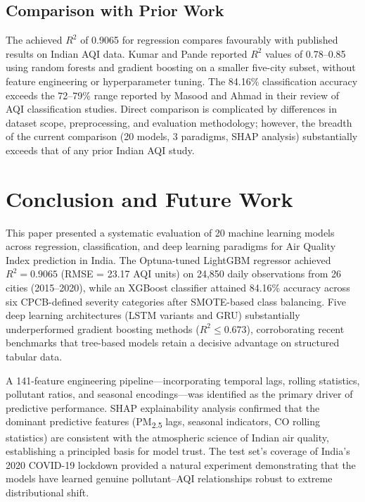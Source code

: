 \documentclass[conference]{IEEEtran}
\begin{document}
\subsection{Comparison with Prior Work}

The achieved $R^2$ of 0.9065 for regression compares favourably with published results on Indian AQI data. Kumar and Pande \cite{kumar2022} reported $R^2$ values of 0.78--0.85 using random forests and gradient boosting on a smaller five-city subset, without feature engineering or hyperparameter tuning. The 84.16\% classification accuracy exceeds the 72--79\% range reported by Masood and Ahmad \cite{masood2023} in their review of AQI classification studies. Direct comparison is complicated by differences in dataset scope, preprocessing, and evaluation methodology; however, the breadth of the current comparison (20 models, 3 paradigms, SHAP analysis) substantially exceeds that of any prior Indian AQI study.

\section{Conclusion and Future Work}

This paper presented a systematic evaluation of 20 machine learning models across regression, classification, and deep learning paradigms for Air Quality Index prediction in India. The Optuna-tuned LightGBM regressor achieved $R^2 = 0.9065$ (RMSE = 23.17 AQI units) on 24{,}850 daily observations from 26 cities (2015--2020), while an XGBoost classifier attained 84.16\% accuracy across six CPCB-defined severity categories after SMOTE-based class balancing. Five deep learning architectures (LSTM variants and GRU) substantially underperformed gradient boosting methods ($R^2 \leq 0.673$), corroborating recent benchmarks that tree-based models retain a decisive advantage on structured tabular data.

A 141-feature engineering pipeline---incorporating temporal lags, rolling statistics, pollutant ratios, and seasonal encodings---was identified as the primary driver of predictive performance. SHAP explainability analysis confirmed that the dominant predictive features (PM\textsubscript{2.5} lags, seasonal indicators, CO rolling statistics) are consistent with the atmospheric science of Indian air quality, establishing a principled basis for model trust. The test set's coverage of India's 2020 COVID-19 lockdown provided a natural experiment demonstrating that the models have learned genuine pollutant--AQI relationships robust to extreme distributional shift.
\end{document}
